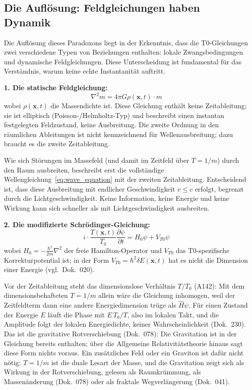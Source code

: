 	\subsection{Die Auflösung: Feldgleichungen haben Dynamik}
	
	Die Auflösung dieses Paradoxons liegt in der Erkenntnis, dass die T0-Gleichungen zwei verschiedene Typen von Beziehungen enthalten: lokale Zwangsbedingungen und dynamische Feldgleichungen. Diese Unterscheidung ist fundamental für das Verständnis, warum keine echte Instantanität auftritt.
	
	\textbf{1. Die statische Feldgleichung:}
	\begin{equation}
		\nabla^2 m = 4\pi G \rho(\mathbf{x},t) \cdot m \label{eq:field_equation}
	\end{equation}
	wobei $\rho(\mathbf{x},t)$ die Massendichte ist. Diese Gleichung enthält keine Zeitableitung; sie ist elliptisch (Poisson-/Helmholtz-Typ) und beschreibt einen instantan festgelegten Feldzustand, keine Ausbreitung. Die zweite Ordnung in den räumlichen Ableitungen ist nicht kennzeichnend für Wellenausbreitung; dazu braucht es die zweite Zeitableitung.
	
	Wie sich Störungen im Massefeld (und damit im Zeitfeld über $T = 1/m$) durch den Raum ausbreiten, beschreibt erst die vollständige Wellengleichung~\eqref{eq:wave_equation} mit der zweiten Zeitableitung. Entscheidend ist, dass diese Ausbreitung mit endlicher Geschwindigkeit $v \leq c$ erfolgt, begrenzt durch die Lichtgeschwindigkeit. Keine Information, keine Energie und keine Wirkung kann sich schneller als mit Lichtgeschwindigkeit ausbreiten.
	
	\textbf{2. Die modifizierte Schrödinger-Gleichung:}
	\begin{equation}
		i \cdot \frac{T(\mathbf{x},t)}{T_0} \frac{\partial \psi}{\partial t} = H_0 \psi + V_{T0} \psi \label{eq:schroedinger}
	\end{equation}
	wobei $H_0 = -\frac{\hbar^2}{2m}\nabla^2$ der freie Hamilton-Operator und $V_{T0}$ das T0-spezifische Korrekturpotential ist; in der Form $V_{T0} = \hbar^2 \delta E(\mathbf{x},t)$ hat es nicht die Dimension einer Energie (vgl.\ Dok.~020).
	
	Vor der Zeitableitung steht das dimensionslose Verhältnis $T/T_0$ (A142): Mit dem dimensionsbehafteten $T=1/m$ allein wäre die Gleichung inhomogen, weil der Zeitfeldterm dann eine andere Energiedimension trüge als $\hat H\psi$. Für einen Zustand der Energie $E$ läuft die Phase mit $E\,T_0/T$, also im lokalen Takt, und die Amplitude folgt der lokalen Energiedichte, keiner Wahrscheinlichkeit (Dok.~230). Das ist die gravitative Rotverschiebung (Dok.~078): Die Gravitation ist in der Gleichung bereits enthalten; über die Allgemeine Relativitätstheorie hinaus sagt diese Form nichts voraus. Ein zusätzliches Feld oder ein Graviton ist dafür nicht nötig: $T=1/m$ ist die duale Lesart der Masse, und die Gravitation zeigt sich als Wirkung in der Rotverschiebung, gelesen als Raumkrümmung, als Massenänderung (Dok.~078) oder als fraktale Wegverlängerung (Dok.~041).
	
